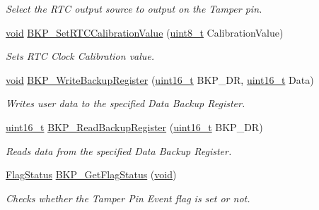 \begin{DoxyCompactItemize}
\begin{DoxyCompactList}\small\item\em Select the R\+TC output source to output on the Tamper pin. \end{DoxyCompactList}\item 
\hyperlink{usb__devapi_8h_afabf60e7f57651d6d595a02c75f07cd0}{void} \hyperlink{group___b_k_p___exported___functions_gad34db08a944450d2e7d56d0fd8db2bca}{B\+K\+P\+\_\+\+Set\+R\+T\+C\+Calibration\+Value} (\hyperlink{_p_e___types_8h_aba7bc1797add20fe3efdf37ced1182c5}{uint8\+\_\+t} Calibration\+Value)
\begin{DoxyCompactList}\small\item\em Sets R\+TC Clock Calibration value. \end{DoxyCompactList}\item 
\hyperlink{usb__devapi_8h_afabf60e7f57651d6d595a02c75f07cd0}{void} \hyperlink{group___b_k_p___exported___functions_ga18d220387db651b3cb71fad5c092e041}{B\+K\+P\+\_\+\+Write\+Backup\+Register} (\hyperlink{_p_e___types_8h_a1f1825b69244eb3ad2c7165ddc99c956}{uint16\+\_\+t} B\+K\+P\+\_\+\+DR, \hyperlink{_p_e___types_8h_a1f1825b69244eb3ad2c7165ddc99c956}{uint16\+\_\+t} Data)
\begin{DoxyCompactList}\small\item\em Writes user data to the specified Data Backup Register. \end{DoxyCompactList}\item 
\hyperlink{_p_e___types_8h_a1f1825b69244eb3ad2c7165ddc99c956}{uint16\+\_\+t} \hyperlink{group___b_k_p___exported___functions_ga359d8fbc945e0f4e34fedbe037d842c8}{B\+K\+P\+\_\+\+Read\+Backup\+Register} (\hyperlink{_p_e___types_8h_a1f1825b69244eb3ad2c7165ddc99c956}{uint16\+\_\+t} B\+K\+P\+\_\+\+DR)
\begin{DoxyCompactList}\small\item\em Reads data from the specified Data Backup Register. \end{DoxyCompactList}\item 
\hyperlink{agilefox_2library_2inc_2stm32f10x__type_8h_a89136caac2e14c55151f527ac02daaff}{Flag\+Status} \hyperlink{group___b_k_p___exported___functions_gacc9aedde760383f0bd146f0d77a547db}{B\+K\+P\+\_\+\+Get\+Flag\+Status} (\hyperlink{usb__devapi_8h_afabf60e7f57651d6d595a02c75f07cd0}{void})
\begin{DoxyCompactList}\small\item\em Checks whether the Tamper Pin Event flag is set or not. \end{DoxyCompactList}\item 

\end{DoxyCompactItemize}
